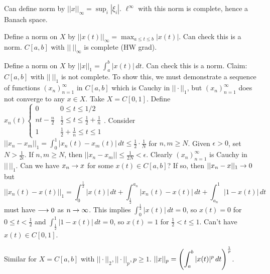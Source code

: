 \documentclass[]{article}
\begin{document}
\begin{recall}
	[$\displaystyle X = \ell^\infty = \setc{x=(\xi_i)_{i=1}^\infty}{\sup_{1\leq i\leq\infty}|\xi_i|<\infty}$]
	Can define norm by $\displaystyle||x||_\infty = \sup_i|\xi_i|$.
	$\ell^\infty$ with this norm is complete, hence a Banach space.
\end{recall}
\begin{example}
	[$X = C{[}a,b{]}$]
	Define a norm on $X$ by $\displaystyle||x(t)||_\infty = \max_{a\leq t\leq b}|x(t)|$.
	Can check this is a norm. $C[a,b]$ with $||\ ||_\infty$ is complete (HW grad).
\end{example}
\begin{example}
	[$X = C{[}a,b{]}$] Define a norm on $X$ by $||x||_1 = \int_a^b|x(t)|\,dt$.
	Can check this is a norm.
	Claim: $C[a,b]$ with $||\ ||_1$ is not complete.
	To show this, we must demonstrate a sequence of functions $(x_n)_{n=1}^\infty$ in $C[a,b]$ which is Cauchy in $||\cdot ||_1$, but $(x_n)_{n=1}^\infty$ does not converge to any $x\in X$.
Take $X = C[0,1]$. Define $x_n(t) \begin{cases} 0 & 0\leq t\leq 1/2 \\ nt-\frac n2 & \frac12 \leq t \leq \frac12+\frac1n \\ 1 & \frac12+\frac1n\leq t\leq 1 \end{cases}$.
		Consider $\displaystyle||x_n-x_m||_1 = \int_0^1|x_n(t)-x_m(t)|\,dt \leq \frac12\cdot\frac1N$ for $n,m\geq N$.
		Given $\epsilon>0$, set $N>\frac1{2\epsilon}$.
		If $n,m\geq N$, then $||x_n-x_m||\leq\frac1{2N}<\epsilon$.
		Clearly $(x_n)_{n=1}^\infty$ is Cauchy in $||\,||_1$.
		Can we have $x_n\rightarrow x$ for some $x(t)\in C[a,b]$?
		If so, then $||x_n-x||_1\rightarrow 0$ but $$||x_n(t)-x(t)||_1 = \int_0^\frac12 |x(t)|\, dt + \int_\frac12^{a_n} |x_n(t)-x(t)|\,dt + \int_{a_n}^1 |1-x(t)|\,dt$$ must have $\longrightarrow 0$ as $n\rightarrow\infty$.
		This implies $\int_0^\frac12|x(t)|\,dt=0$, so $x(t)=0$ for $0\leq t<\frac12$ and $\int_\frac12^1 |1-x(t)|\, dt = 0$, so $x(t) = 1$ for $\frac12<t\leq 1$.
		Can't have $x(t)\in C[0,1]$.
\end{example}
\begin{example}
	Similar for $X=C[a,b]$ with $||\cdot||_2,||\cdot||_p,p\geq 1$.
	$\displaystyle ||x||_p = \left(\int_a^b|x(t)|^p\,dt\right)^\frac1p$.
\end{example}
\end{document}
